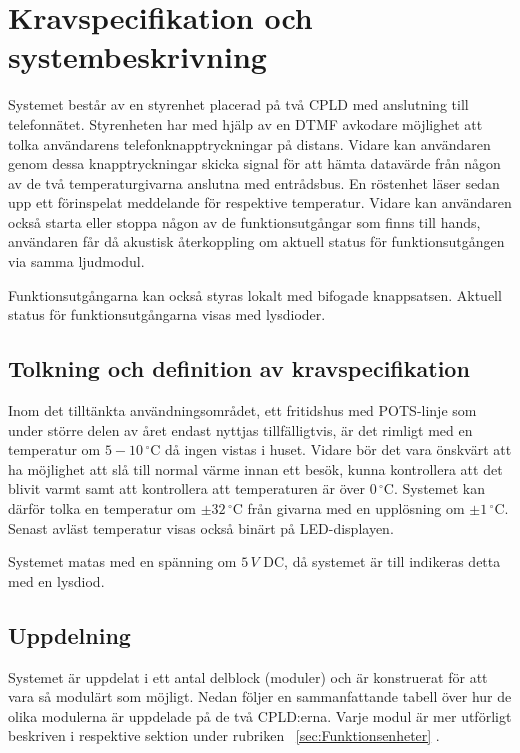 \documentclass[a4paper,11pt]{article}
\begin{document}
\section{Kravspecifikation och systembeskrivning}
	Systemet består av en styrenhet placerad på två CPLD med anslutning till telefonnätet. Styrenheten har med hjälp av en DTMF avkodare möjlighet att tolka användarens telefonknapptryckningar på distans. Vidare kan användaren genom dessa knapptryckningar skicka signal för att hämta datavärde från någon av de två temperaturgivarna anslutna med entrådsbus. En röstenhet läser sedan upp ett förinspelat meddelande för respektive temperatur. Vidare kan användaren också starta eller stoppa någon av de funktionsutgångar som finns till hands, användaren får då akustisk återkoppling om aktuell status för funktionsutgången via samma ljudmodul.

Funktionsutgångarna kan också styras lokalt med bifogade knappsatsen. Aktuell status för funktionsutgångarna visas med lysdioder. 

	\subsection{Tolkning och definition av kravspecifikation}

		Inom det tilltänkta användningsområdet, ett fritidshus med POTS-linje som under större delen av året endast nyttjas tillfälligtvis, är det rimligt med en temperatur om $5-10\,^{\circ}\mathrm{C}$ då ingen vistas i huset. Vidare bör det vara önskvärt att ha möjlighet att slå till normal värme innan ett besök, kunna kontrollera att det blivit varmt samt att kontrollera att temperaturen är över $0\,^{\circ}\mathrm{C}$. Systemet kan därför tolka en temperatur om $\pm 32\,^{\circ}\mathrm{C}$ från givarna med en upplösning om $\pm 1\,^{\circ}\mathrm{C}$. Senast avläst temperatur visas också binärt på LED-displayen.

		Systemet matas med en spänning om $5\,V$ DC, då systemet är till indikeras detta med en lysdiod.

	\subsection{Uppdelning}

	Systemet är uppdelat i ett antal delblock (moduler) och är konstruerat för att vara så modulärt som möjligt.
	Nedan följer en sammanfattande tabell över hur de olika modulerna är uppdelade på de två CPLD:erna. Varje modul är mer
	utförligt beskriven i respektive sektion under rubriken ~\ref{sec:Funktionsenheter} . 
\end{document}
